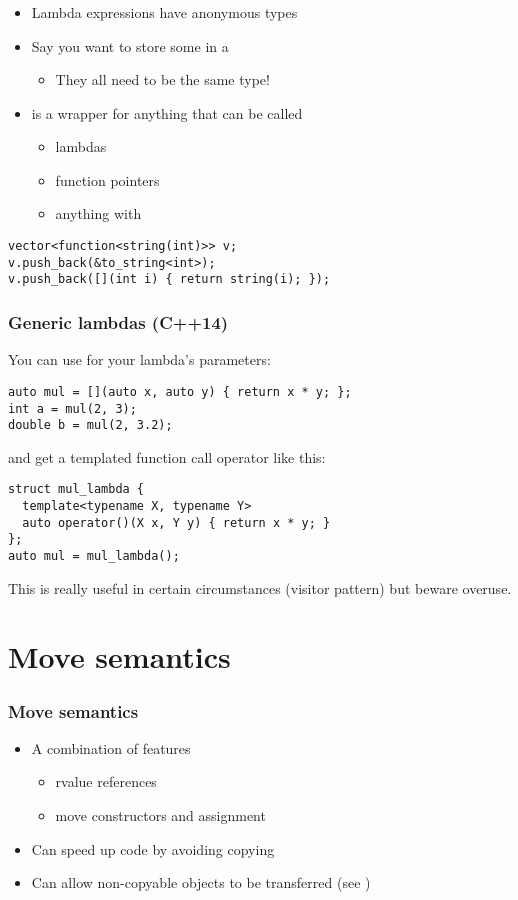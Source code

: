 \documentclass[aspectratio=1610]{beamer}
\begin{document}
\begin{frame}[fragile]
  \frametitle{}
  \begin{itemize}
  \item Lambda expressions have anonymous types
  \item Say you want to store some in a 
    \begin{itemize}
    \item They all need to be the same type!
    \end{itemize}
  \item {} is a wrapper for anything that can be called
    \begin{itemize}
    \item lambdas
    \item function pointers
    \item anything with 
    \end{itemize}
  \end{itemize}
\begin{verbatim}
vector<function<string(int)>> v;
v.push_back(&to_string<int>);
v.push_back([](int i) { return string(i); });
\end{verbatim}
\end{frame}

\begin{frame}[fragile]
  \frametitle{Generic lambdas (C++14)}
  You can use  for your lambda's parameters:
\begin{verbatim}
auto mul = [](auto x, auto y) { return x * y; };
int a = mul(2, 3);
double b = mul(2, 3.2);
\end{verbatim}
  and get a templated function call operator like this:
\begin{verbatim}
struct mul_lambda {
  template<typename X, typename Y>
  auto operator()(X x, Y y) { return x * y; }
};
auto mul = mul_lambda();
\end{verbatim}
  This is really useful in certain circumstances (visitor pattern) but beware
overuse.
\end{frame}

\section{Move semantics}

\begin{frame}
  \frametitle{Move semantics}
  \begin{itemize}
  \item A combination of features
    \begin{itemize}
    \item rvalue references
    \item move constructors and assignment
    \end{itemize}
  \item Can speed up code by avoiding copying
  \item Can allow non-copyable objects to be transferred (see
    )
  \end{itemize}
\end{frame}
\end{document}
